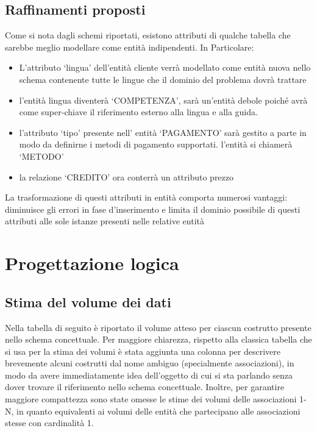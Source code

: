 \documentclass[a4paper,12pt]{report}
\begin{document}
\section{Raffinamenti proposti}
Come si nota dagli schemi riportati, esistono attributi di qualche tabella che sarebbe
meglio modellare come entità indipendenti. In Particolare:
\begin{itemize}
	\item L'attributo `lingua' dell'entità cliente verrà modellato come entità nuova nello schema contenente tutte le lingue che il dominio del problema dovrà trattare
	\item l'entità lingua diventerà `COMPETENZA', sarà un'entità debole poiché avrà come super-chiave il riferimento esterno alla lingua e alla guida.
	\item l'attributo `tipo' presente nell' entità  `PAGAMENTO' sarà gestito a parte in modo da definirne i metodi di pagamento supportati. l'entità si chiamerà `METODO'
	\item la relazione `CREDITO' ora conterrà un attributo prezzo
\end{itemize}
La trasformazione di questi attributi in entità comporta numerosi vantaggi:
diminuisce gli errori in fase d'inserimento e limita il dominio possibile di questi
attributi alle sole istanze presenti nelle relative entità


\newpage
\chapter{Progettazione logica}
\section{Stima del volume dei dati}
Nella tabella di seguito è riportato il volume atteso per ciascun costrutto presente
nello schema concettuale.
Per maggiore chiarezza, rispetto alla classica tabella che si usa per la stima dei
volumi è stata aggiunta una colonna per descrivere brevemente alcuni costrutti dal
nome ambiguo (specialmente associazioni), in modo da avere immediatamente idea
dell’oggetto di cui si sta parlando senza dover trovare il riferimento nello schema
concettuale.
Inoltre, per garantire maggiore compattezza sono state omesse le stime dei volumi
delle associazioni 1-N, in quanto equivalenti ai volumi delle entità che partecipano
alle associazioni stesse con cardinalità 1.
\end{document}
